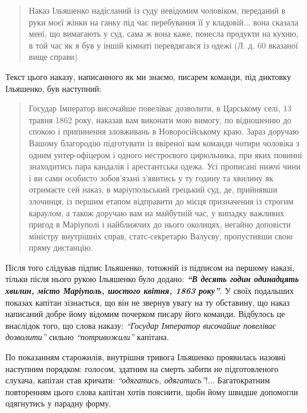 \documentclass[a4paper,20pt]{report}
\begin{document}
\begin{quote}
\em\bfseries

Наказ Ільяшенко надісланий із суду невідомим чоловіком, переданий в руки моєї
жінки на ганку під час перебування її у кладовій... вона сказала мені, що
вимагають у суд, сама ж вона каже, понесла продукти на кухню, в той час як я
був у іншій кімнаті перевдягався із одежі (Л. д. 60 вказаної вище справи)
    
\end{quote}

Текст цього наказу, написанного як ми знаємо, писарем команди, під диктовку
Ільяшенко, був наступний:

\begin{quote}
\em\bfseries

Государ Імператор височайше повеліває дозволити, в Царському селі, 13 травня 1862
року, наказав вам виконати мою вимогу, по відношенню до спокою і
припинення зловживань в Новоросійському краю. Зараз доручаю Вашому
благородію підготувати із ввіреної вам команди чотири чоловіка з одним
унтер-офіцером і одного нестроєвого цирюльника, при яких повинні знаходитись
пара кандалів і арестантська одежа. Усі прописані нижчі чини і ви сами
особисто зобов'язані з'явитись у ту годину та хвилину як отримаєте сей наказ,
в маріупольський грецький суд, де, прийнявши злочинця, із першим етапом відправити
до місця призначення із строгим караулом, а також доручаю вам на майбутній час, у випадку
важливих пригод в Маріуполі і найближчих до нього околицях, негайно доповісти міністру
внутрішніх справ, статс-секретарю Валуєву, пропустивши свою пряму дистанцію.

\end{quote}

Після того слідував підпис Ільяшенко, тотожній із підписом на першому наказі, тільки після нього
рукою Ільяшенко було додано: \textbf{\em ``В десять годин одинадцять хвилин, місто Маріуполь, шостого квітня, 1863 року''}.
У своїх подальших показах капітан зізнається, що він не звернув увагу на ту обставину, що наказ написаний
добре йому відомим почерком писару його команди. Відбулось це внаслідок того, що слова наказу:
\emph{``Государ Імператор височайше повеліває дозволити''} сильно \emph{``потривожили''} капітана.

По показанням старожилів, внутрішня тривога Ільяшенко проявилась назовні
наступним порядком: голосом, здатним на смерть забити не підготовленого
слухача, капітан став кричати: \emph{``одягатись, одягатись''}!...
Багатократним повторенням цього слова капітан хотів пояснити, щоби йому швидше
допомогли одягнутись у парадну форму.
\end{document}
